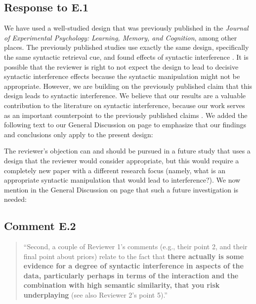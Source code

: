 \documentclass[12pt]{article}
\begin{document}
\subsection*{Response to E.1}
We have used a well-studied design that was previously published in the \textit{Journal of Experimental Psychology: Learning, Memory, and Cognition}, among other places. The previously published studies use exactly the same design, specifically the same syntactic retrieval cue, and found effects of syntactic interference \citep{vandyke07,mertzen}.
It is possible that the reviewer is right to not expect the design to lead to decisive syntactic interference effects because the syntactic manipulation might not be appropriate. However, we are building on the previously published claim that this design leads to syntactic interference. We believe that our results are a valuable contribution to the literature on syntactic interference, because our work serves as an important counterpoint to the previously published claims \citep{vandyke07, mertzen}. We added the following text to our General Discussion on page \pageref{only_this_design} to emphasize that our findings and conclusions only apply to the present design:

\begin{quote}
\end{quote}

The reviewer's objection can and should be pursued in a future study that uses a design that the reviewer would consider appropriate, but this would require a completely new paper with a different research focus (namely, what is an appropriate syntactic manipulation that would lead to interference?). We now mention in the General Discussion on page \pageref{future_work}
that such a future investigation is needed:

\begin{quote}
\end{quote}

\subsection*{Comment E.2}

\begin{quote}
``Second, a couple of Reviewer 1's comments (e.g., their point 2, and their final point about priors) relate to the fact that \textbf{there actually is some evidence for a degree of syntactic interference in aspects of the data, particularly perhaps in terms of the interaction and the combination with high semantic similarity, that you risk underplaying} (see also Reviewer 2's point 5).''
\end{quote}
\end{document}
